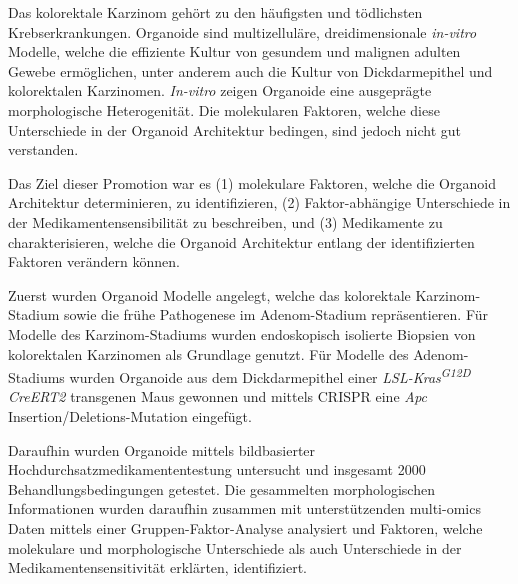 Das kolorektale Karzinom gehört zu den häufigsten und tödlichsten Krebserkrankungen. Organoide sind multizelluläre, dreidimensionale \textit{in-vitro} Modelle, welche die effiziente Kultur von gesundem und malignen adulten Gewebe ermöglichen, unter anderem auch die Kultur von Dickdarmepithel und kolorektalen Karzinomen. \textit{In-vitro} zeigen Organoide eine ausgeprägte morphologische Heterogenität. Die molekularen Faktoren, welche diese Unterschiede in der Organoid Architektur bedingen, sind jedoch nicht gut verstanden.
\bigbreak

Das Ziel dieser Promotion war es (1) molekulare Faktoren, welche die Organoid Architektur determinieren, zu identifizieren, (2) Faktor-abhängige Unterschiede in der Medikamentensensibilität zu beschreiben, und (3) Medikamente zu charakterisieren, welche die Organoid Architektur entlang der identifizierten Faktoren verändern können. 
\bigbreak

Zuerst wurden Organoid Modelle angelegt, welche das kolorektale Karzinom-Stadium sowie die frühe Pathogenese im Adenom-Stadium repräsentieren. Für Modelle des Karzinom-Stadiums wurden endoskopisch isolierte Biopsien von kolorektalen Karzinomen als Grundlage genutzt. Für Modelle des Adenom-Stadiums wurden Organoide aus dem Dickdarmepithel einer \textit{LSL-Kras\textsuperscript{G12D} CreERT2} transgenen Maus gewonnen und mittels CRISPR eine  \textit{Apc} Insertion/Deletions-Mutation eingefügt.
\bigbreak

Daraufhin wurden Organoide mittels bildbasierter Hochdurchsatzmedikamententestung untersucht und insgesamt 2000 Behandlungsbedingungen getestet. Die gesammelten morphologischen Informationen wurden daraufhin zusammen mit unterstützenden multi-omics Daten mittels einer Gruppen-Faktor-Analyse analysiert und Faktoren, welche molekulare und morphologische Unterschiede als auch Unterschiede in der Medikamentensensitivität erklärten, identifiziert.
\bigbreak

